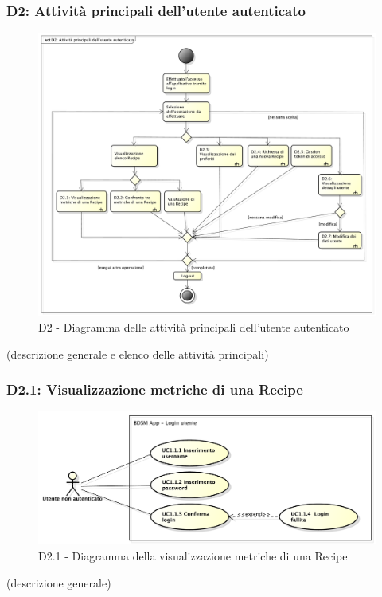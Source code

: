 		\subsubsection{D2: Attività principali dell'utente autenticato} %
		\label{ssub:attivita_principali_dell_utente_autenticato}
		\begin{figure}[!htbp]
			\centering
			\centerline{\includegraphics[scale=0.41]{./images/D2.pdf}}
			\caption{D2 - Diagramma delle attività principali dell'utente autenticato}
		\end{figure}
		\noindent
		[TO DO] (descrizione generale e elenco delle attività principali)


		\subsubsection{D2.1: Visualizzazione metriche di una Recipe} %
		\label{ssub:visualizzazione_metriche_di_una_recipe}
		\label{ssub:registrazione_al_sistema}
		\begin{figure}[!htbp]
			\centering
			\centerline{\includegraphics[scale=0.45]{./images/UC1_1.pdf}}
			\caption{D2.1 - Diagramma della visualizzazione metriche di una Recipe}
		\end{figure}
		\noindent
		[TO DO] (descrizione generale)

